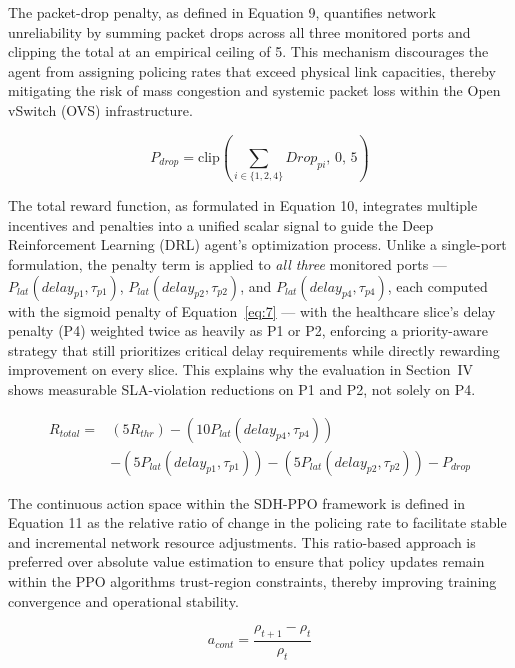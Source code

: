 \documentclass[conference]{IEEEtran}
\begin{document}
The packet-drop penalty, as defined in Equation 9, quantifies network unreliability by summing packet drops across all three monitored ports and clipping the total at an empirical ceiling of 5. This mechanism discourages the agent from assigning policing rates that exceed physical link capacities, thereby mitigating the risk of mass congestion and systemic packet loss within the Open vSwitch (OVS) infrastructure.

\begin{equation}\label{eq:9}
P_{drop} = \text{clip}\left( \sum_{i \in \{1,2,4\}}{Drop_{pi}},\,0,\,5 \right)
\end{equation}

The total reward function, as formulated in Equation 10, integrates multiple incentives and penalties into a unified scalar signal to guide the Deep Reinforcement Learning (DRL) agent's optimization process. Unlike a single-port formulation, the penalty term is applied to \emph{all three} monitored ports --- \(P_{lat}(delay_{p1},\tau_{p1})\), \(P_{lat}(delay_{p2},\tau_{p2})\), and \(P_{lat}(delay_{p4},\tau_{p4})\), each computed with the sigmoid penalty of Equation~\ref{eq:7} --- with the healthcare slice's delay penalty (P4) weighted twice as heavily as P1 or P2, enforcing a priority-aware strategy that still prioritizes critical delay requirements while directly rewarding improvement on every slice. This explains why the evaluation in Section~IV shows measurable SLA-violation reductions on P1 and P2, not solely on P4.

\begin{equation}\label{eq:10}
\begin{split}
R_{total} = {}& \left( 5 R_{thr} \right) - \left( 10 P_{lat}(delay_{p4},\tau_{p4}) \right) \\
& - \left( 5 P_{lat}(delay_{p1},\tau_{p1}) \right) - \left( 5 P_{lat}(delay_{p2},\tau_{p2}) \right) - P_{drop}
\end{split}
\end{equation}

The continuous action space within the SDH-PPO framework is defined in Equation 11 as the relative ratio of change in the policing rate to facilitate stable and incremental network resource adjustments. This ratio-based approach is preferred over absolute value estimation to ensure that policy updates remain within the PPO algorithm\textquotesingle s trust-region constraints, thereby improving training convergence and operational stability.

\begin{equation}\label{eq:11}
a_{cont} = \frac{\rho_{t + 1} - \rho_{t}}{\rho_{t}}
\end{equation}
\end{document}
